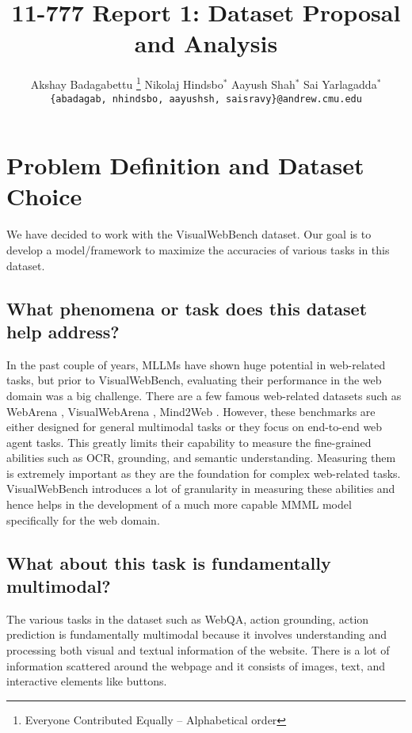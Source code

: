 \documentclass[11pt,a4paper]{article}
\title{11-777 Report 1: Dataset Proposal and Analysis}
\author{
  Akshay Badagabettu \thanks{\hspace{4pt}Everyone Contributed Equally -- Alphabetical order} \hspace{2em}Nikolaj Hindsbo$^*$ \hspace{2em} Aayush Shah$^*$ \hspace{2em} Sai Yarlagadda$^*$ \\
  \texttt{\{abadagab, nhindsbo, aayushsh, saisravy\}@andrew.cmu.edu}
  }
\date{}
\begin{document}
\maketitle
\section{Problem Definition and Dataset Choice}

We have decided to work with the VisualWebBench \cite{liu2024visualwebbench} dataset. Our goal is to develop a model/framework to maximize the accuracies of various tasks in this dataset.

\subsection{What phenomena or task does this dataset help address?}

In the past couple of years, MLLMs have shown huge potential in web-related tasks, but prior to VisualWebBench, evaluating their performance in the web domain was a big challenge. There are a few famous web-related datasets such as WebArena \cite{zhou2023webarena}, VisualWebArena \cite{koh2024visualwebarena}, Mind2Web \cite{deng2024mind2web}. However, these benchmarks are either designed for general multimodal tasks or they focus on end-to-end web agent tasks. This greatly limits their capability to measure the fine-grained abilities such as OCR, grounding, and semantic understanding. Measuring them is extremely important as they are the foundation for complex web-related tasks. VisualWebBench introduces a lot of granularity in measuring these abilities and hence helps in the development of a much more capable MMML model specifically for the web domain.

\subsection{What about this task is fundamentally multimodal?}

The various tasks in the dataset such as WebQA, action grounding, action prediction is fundamentally multimodal because it involves understanding and processing both visual and textual information of the website. There is a lot of information scattered around the webpage and it consists of images, text, and interactive elements like buttons.
\end{document}
